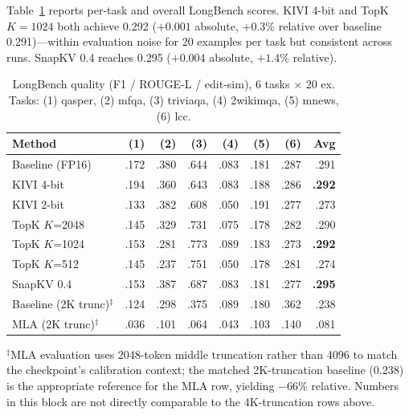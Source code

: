 \documentclass[conference]{IEEEtran}
\begin{document}
Table~\ref{tab:quality} reports per-task and overall LongBench scores.
KIVI 4-bit and TopK $K\!=\!1024$ both achieve 0.292 ($+0.001$ absolute,
$+0.3\%$ relative over baseline 0.291)---within evaluation noise for
20 examples per task but consistent across runs.  SnapKV 0.4 reaches
0.295 ($+0.004$ absolute, $+1.4\%$ relative).

\begin{table}[!t]
\centering
\caption{LongBench quality (F1 / ROUGE-L / edit-sim), 6 tasks $\times$ 20 ex.
Tasks: (1) qasper, (2) mfqa, (3) triviaqa, (4) 2wikimqa,
(5) mnews, (6) lcc.}
\label{tab:quality}
\setlength{\tabcolsep}{3.5pt}
\begin{tabular}{@{}lrrrrrrr@{}}
\toprule
\textbf{Method} & \textbf{(1)} & \textbf{(2)} & \textbf{(3)} & \textbf{(4)} & \textbf{(5)} & \textbf{(6)} & \textbf{Avg} \\
\midrule
Baseline (FP16)       & .172 & .380 & .644 & .083 & .181 & .287 & .291 \\
KIVI 4-bit            & .194 & .360 & .643 & .083 & .188 & .286 & \textbf{.292} \\
KIVI 2-bit            & .133 & .382 & .608 & .050 & .191 & .277 & .273 \\
TopK $K$=2048         & .145 & .329 & .731 & .075 & .178 & .282 & .290 \\
TopK $K$=1024         & .153 & .281 & .773 & .089 & .183 & .273 & \textbf{.292} \\
TopK $K$=512          & .145 & .237 & .751 & .050 & .178 & .281 & .274 \\
SnapKV 0.4            & .153 & .387 & .687 & .083 & .181 & .277 & \textbf{.295} \\
\midrule
Baseline (2K trunc)$^{\ddagger}$ & .124 & .298 & .375 & .089 & .180 & .362 & .238 \\
MLA (2K trunc)$^{\ddagger}$      & .036 & .101 & .064 & .043 & .103 & .140 & .081 \\
\bottomrule
\end{tabular}
\vspace{1pt}
\footnotesize{$^{\ddagger}$MLA evaluation uses 2048-token middle truncation rather
than 4096 to match the checkpoint's calibration context; the matched
2K-truncation baseline (0.238) is the appropriate reference for the
MLA row, yielding $-66\%$ relative.  Numbers in this block are not
directly comparable to the 4K-truncation rows above.}
\end{table}
\end{document}
